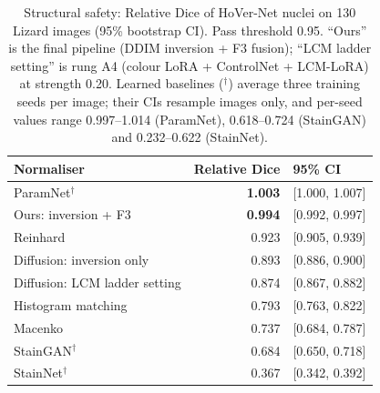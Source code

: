 \begin{table}[t]
\centering
\caption{Structural safety: Relative Dice of HoVer-Net nuclei on 130 Lizard images (95\% bootstrap CI).
Pass threshold 0.95. ``Ours'' is the final pipeline (DDIM inversion + F3 fusion); ``LCM ladder setting'' is
rung A4 (colour LoRA + ControlNet + LCM-LoRA) at strength 0.20. Learned baselines ($^\dagger$)
average three training seeds per image; their CIs resample images only, and per-seed values range
0.997--1.014 (ParamNet), 0.618--0.724 (StainGAN) and 0.232--0.622 (StainNet).}
\label{tab:reldice}
\small
\begin{tabular}{lrl}
\toprule
Normaliser & Relative Dice & 95\% CI\\
\midrule
ParamNet$^\dagger$ & \textbf{1.003} & [1.000, 1.007]\\
Ours: inversion + F3 & \textbf{0.994} & [0.992, 0.997]\\
Reinhard & 0.923 & [0.905, 0.939]\\
Diffusion: inversion only & 0.893 & [0.886, 0.900]\\
Diffusion: LCM ladder setting & 0.874 & [0.867, 0.882]\\
Histogram matching & 0.793 & [0.763, 0.822]\\
Macenko & 0.737 & [0.684, 0.787]\\
StainGAN$^\dagger$ & 0.684 & [0.650, 0.718]\\
StainNet$^\dagger$ & 0.367 & [0.342, 0.392]\\
\bottomrule
\end{tabular}
\end{table}


